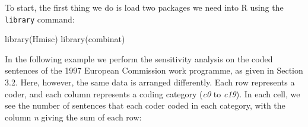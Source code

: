 \documentclass[
]{book}
\newenvironment{Shaded}{\begin{snugshade}}{\end{snugshade}}
\newcommand{\FunctionTok}[1]{\textcolor[rgb]{0.00,0.00,0.00}{#1}}
\newcommand{\NormalTok}[1]{#1}
\begin{document}
To start, the first thing we do is load two packages we need into R using the \texttt{library} command:

\begin{Shaded}
\begin{Highlighting}[]
\FunctionTok{library}\NormalTok{(Hmisc)}
\FunctionTok{library}\NormalTok{(combinat)}
\end{Highlighting}
\end{Shaded}

In the following example we perform the sensitivity analysis on the coded sentences of the 1997 European Commission work programme, as given in Section 3.2. Here, however, the same data is arranged differently. Each row represents a coder, and each column represents a coding category (\emph{c0} to \emph{c19}). In each cell, we see the number of sentences that each coder coded in each category, with the column \emph{n} giving the sum of each row:
\end{document}
